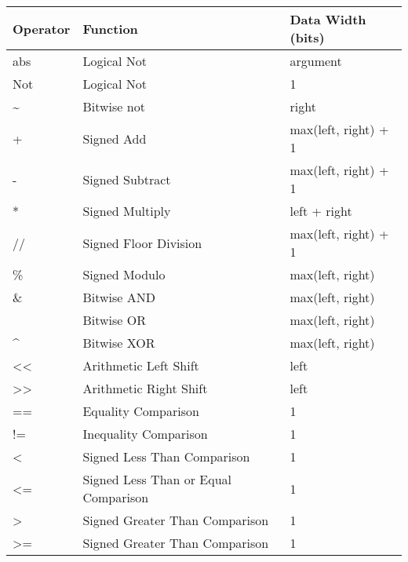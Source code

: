 \documentclass[letterpaper,10pt,english]{manual}
\begin{document}
\begin{tabulary}{\textwidth}{|L|L|L|}
\hline
\textbf{
Operator
} & \textbf{
Function
} & \textbf{
Data Width (bits)
}\\
\hline

abs
 & 
Logical Not
 & 
argument
\\

Not
 & 
Logical Not
 & 
1
\\

\textasciitilde{}
 & 
Bitwise not
 & 
right
\\

+
 & 
Signed Add
 & 
max(left, right) + 1
\\

-
 & 
Signed Subtract
 & 
max(left, right) + 1
\\

*
 & 
Signed Multiply
 & 
left + right
\\

//
 & 
Signed Floor Division
 & 
max(left, right) + 1
\\

\%
 & 
Signed Modulo
 & 
max(left, right)
\\

\&
 & 
Bitwise AND
 & 
max(left, right)
\\

\textbar{}
 & 
Bitwise OR
 & 
max(left, right)
\\

\textasciicircum{}
 & 
Bitwise XOR
 & 
max(left, right)
\\

\textless{}\textless{}
 & 
Arithmetic Left Shift
 & 
left
\\

\textgreater{}\textgreater{}
 & 
Arithmetic Right Shift
 & 
left
\\

==
 & 
Equality Comparison
 & 
1
\\

!=
 & 
Inequality Comparison
 & 
1
\\

\textless{}
 & 
Signed Less Than
Comparison
 & 
1
\\

\textless{}=
 & 
Signed Less Than or Equal
Comparison
 & 
1
\\

\textgreater{}
 & 
Signed Greater Than
Comparison
 & 
1
\\

\textgreater{}=
 & 
Signed Greater Than
Comparison
 & 
1
\\
\hline
\end{tabulary}
\end{document}

